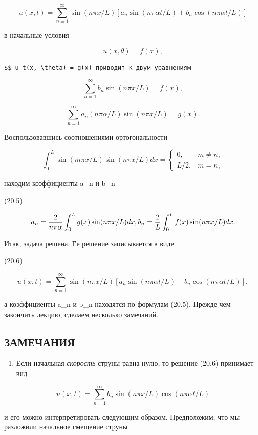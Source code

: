 \documentclass[
  ukrainian,
]{article}
\providecommand{\tightlist}{%
  \setlength{\itemsep}{0pt}\setlength{\parskip}{0pt}}
\begin{document}
\[
u(x, t) = \sum_{n=1}^{\infty} \sin(n\pi x/L) \left[ a_n \sin(n\pi \alpha t/L) + b_n \cos(n\pi \alpha t/L) \right]
\]

в начальные условия

\[
u(x, \theta) = f(x),
\]

\begin{verbatim}
$$ u_t(x, \theta) = g(x) приводит к двум уравнениям
\end{verbatim}

\[
\sum_{n=1}^{\infty} b_n \sin(n\pi x/L) = f(x),
\]

\[
\sum_{n=1}^{\infty} a_n (n\pi \alpha/L) \sin(n\pi x/L) = g(x).
\]

Воспользовавшись соотношениями ортогональности

\[
\int_{0}^{L} \sin(m\pi x/L) \sin(n\pi x/L) dx = \begin{cases} 0, &m \neq n, \\ L/2, & m = n, \end{cases}
\]

находим коэффициенты a\_n и b\_n

(20.5)

\[
a_{n} = \frac{2}{n\pi\alpha} \int_{0}^{L} g(x) \sin(n\pi x/L) dx, \\ b_{n} = \frac{2}{L} \int_{0}^{L} f(x) \sin(n\pi x/L) dx.
\]

Итак, задача решена. Ее решение записывается в виде

(20.6)

\[
u(x, t) = \sum_{n=1}^{\infty} \sin(n\pi x/L) \left[ a_n \sin(n\pi \alpha t/L) + b_n \cos(n\pi \alpha t/L) \right],
\]

а коэффициенты a\_n и b\_n находятся по формулам (20.5). Прежде чем
закончить лекцию, сделаем несколько замечаний.

\subsection{ЗАМЕЧАНИЯ}\label{ux437ux430ux43cux435ux447ux430ux43dux438ux44f-3}

\begin{enumerate}
\def\labelenumi{\arabic{enumi}.}
\tightlist
\item
  Если начальная \emph{скорость} струны равна нулю, то решение (20.6)
  принимает вид
\end{enumerate}

\[
u(x, t) = \sum_{n=1}^{\infty} b_n \sin(n\pi x/L) \cos(n\pi\alpha t/L)
\]

и его можно интерпретировать следующим образом. Предположим, что мы
разложили начальное смещение струны
\end{document}

